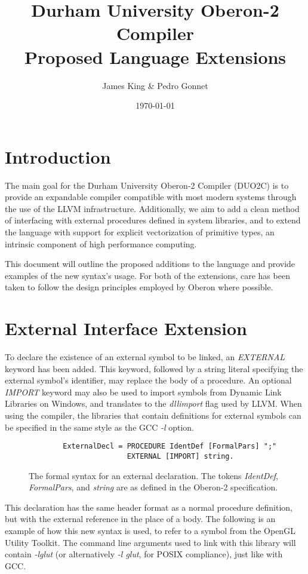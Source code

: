 \documentclass[a4paper,11pt]{article}
\title{\centering Durham University Oberon-2 Compiler \\ Proposed Language Extensions}
\date{\today}
\author{James King \& Pedro Gonnet}
\begin{document}
    \maketitle

    \section{Introduction}
    The main goal for the Durham University Oberon-2 Compiler (DUO2C) is to provide an expandable compiler compatible with most modern systems through the use of the LLVM infrastructure. Additionally, we aim to add a clean method of interfacing with external procedures defined in system libraries, and to extend the language with support for explicit vectorization of primitive types, an intrinsic component of high performance computing.

    This document will outline the proposed additions to the language and provide examples of the new syntax's usage. For both of the extensions, care has been taken to follow the design principles employed by Oberon where possible.

    \section{External Interface Extension}
    To declare the existence of an external symbol to be linked, an \emph{EXTERNAL} keyword has been added. This keyword, followed by a string literal specifying the external symbol's identifier, may replace the body of a procedure. An optional \emph{IMPORT} keyword may also be used to import symbols from Dynamic Link Libraries on Windows, and translates to the \emph{dllimport} flag used by LLVM. When using the compiler, the libraries that contain definitions for external symbols can be specified in the same style as the GCC \emph{-l} option.

    \begin{figure}[h]
    \begin{lstlisting}
        ExternalDecl = PROCEDURE IdentDef [FormalPars] ";"
                       EXTERNAL [IMPORT] string.
    \end{lstlisting}
    \caption{The formal syntax for an external declaration. The tokens \emph{IdentDef}, \emph{FormalPars}, and \emph{string} are as defined in the Oberon-2 specification\cite{oberspec}.}
    \end{figure}

    \noindent
    This declaration has the same header format as a normal procedure definition, but with the external reference in the place of a body. The following is an example of how this new syntax is used, to refer to a symbol from the OpenGL Utility Toolkit\cite{glut}. The command line arguments used to link with this library will contain \emph{-lglut} (or alternatively \emph{-l glut}, for POSIX compliance), just like with GCC.
\end{document}
